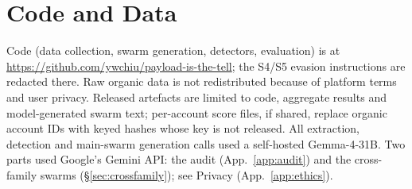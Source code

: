 \documentclass[10pt]{article}
\begin{document}
\section*{Code and Data}
Code (data collection, swarm generation, detectors, evaluation) is at \url{https://github.com/ywchiu/payload-is-the-tell}; the S4/S5 evasion instructions are redacted there. Raw organic data is not redistributed because of platform terms and user privacy. Released artefacts are limited to code, aggregate results and model-generated swarm text; per-account score files, if shared, replace organic account IDs with keyed hashes whose key is not released. All extraction, detection and main-swarm generation calls used a self-hosted Gemma-4-31B. Two parts used Google's Gemini API: the audit (App.~\ref{app:audit}) and the cross-family swarms (\S\ref{sec:crossfamily}); see Privacy (App.~\ref{app:ethics}).
\end{document}
